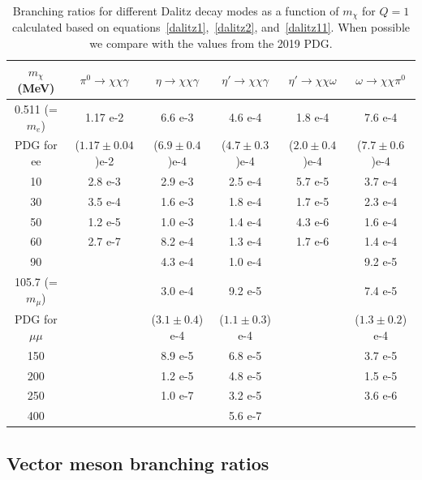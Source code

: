 \documentclass[12pt]{article}
\begin{document}
\begin{table}
  \begin{center}
    { \footnotesize
  \begin{tabular}{|c|c|c|c|c|c|}
    \hline
    $m_\chi$ (MeV) & $\pi^0 \to \chi \chi \gamma$ & $\eta \to \chi \chi \gamma$
    & $\eta' \to \chi \chi \gamma$ & $\eta' \to \chi \chi \omega$
    & $\omega \to \chi \chi \pi^0$ \\ \hline \hline
  0.511 (=$m_e$)  & 1.17 e-2 & 6.6 e-3 & 4.6 e-4 & 1.8 e-4 & 7.6 e-4 \\
  PDG for ee  & ($1.17 \pm 0.04$)e-2 & ($6.9 \pm 0.4$)e-4 & ($4.7 \pm 0.3$)e-4  &
  ($2.0 \pm 0.4$)e-4  & ($7.7 \pm 0.6$)e-4 \\ \hline
  10              & 2.8 e-3  & 2.9 e-3 & 2.5 e-4 & 5.7 e-5 & 3.7 e-4 \\
  30              & 3.5 e-4  & 1.6 e-3 & 1.8 e-4 & 1.7 e-5 & 2.3 e-4 \\
  50              & 1.2 e-5  & 1.0 e-3 & 1.4 e-4 & 4.3 e-6 & 1.6 e-4 \\
  60              & 2.7 e-7  & 8.2 e-4 & 1.3 e-4 & 1.7 e-6 & 1.4 e-4 \\
  90              &         & 4.3 e-4 & 1.0 e-4 &        & 9.2 e-5 \\ \hline
  105.7 (=$m_\mu$)&         & 3.0 e-4 & 9.2 e-5 &         & 7.4 e-5 \\
  PDG for $\mu\mu$ &      & ($3.1 \pm 0.4$) e-4 & ($1.1 \pm 0.3$) e-4 & &
                      ($1.3 \pm 0.2$) e-4 \\ \hline
  150             &        & 8.9 e-5  & 6.8 e-5 &        & 3.7 e-5 \\
  200             &        & 1.2 e-5  & 4.8 e-5 &        & 1.5 e-5 \\
  250             &        & 1.0 e-7 & 3.2 e-5 &         & 3.6 e-6 \\
  400             &        &        & 5.6 e-7 &         &        \\ \hline 
  \end{tabular}
  }
  \caption{\protect Branching ratios for different Dalitz decay modes as 
    a function of $m_\chi$ for $Q=1$ calculated 
    based on equations~\ref{dalitz1},~\ref{dalitz2}, and~\ref{dalitz11}. 
When possible we compare with 
  the values from the 2019 PDG.}
\label{tab:dalitz1}
  \end{center}
\end{table}

\subsection{Vector meson branching ratios}
\end{document}
